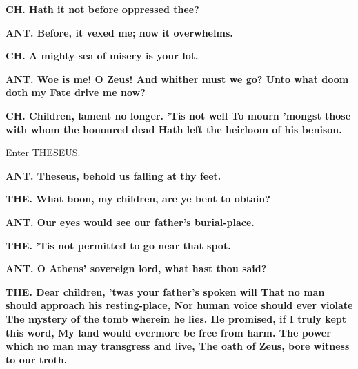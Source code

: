 \documentclass[11pt,letter]{book}
\begin{document}
\par \textbf{CH. Hath it not before oppressed thee?}
\par 

\par \textbf{ANT. Before, it vexed me; now it overwhelms.}
\par 

\par \textbf{CH. A mighty sea of misery is your lot.}
\par 

\par \textbf{ANT. Woe is me! O Zeus! And whither must we go? Unto what doom doth my Fate drive me now?}
\par 

\par \textbf{CH. Children, lament no longer. ’Tis not well To mourn ’mongst those with whom the honoured dead Hath left the heirloom of his benison.}
\par 

\par  Enter THESEUS.

\par \textbf{ANT. Theseus, behold us falling at thy feet.}
\par 

\par \textbf{THE. What boon, my children, are ye bent to obtain?}
\par 

\par \textbf{ANT. Our eyes would see our father’s burial-place.}
\par 

\par \textbf{THE. ’Tis not permitted to go near that spot.}
\par 

\par \textbf{ANT. O Athens’ sovereign lord, what hast thou said?}
\par 

\par \textbf{THE. Dear children, ’twas your father’s spoken will That no man should approach his resting-place, Nor human voice should ever violate The mystery of the tomb wherein he lies. He promised, if I truly kept this word, My land would evermore be free from harm. The power which no man may transgress and live, The oath of Zeus, bore witness to our troth.}
\par 
\end{document}
